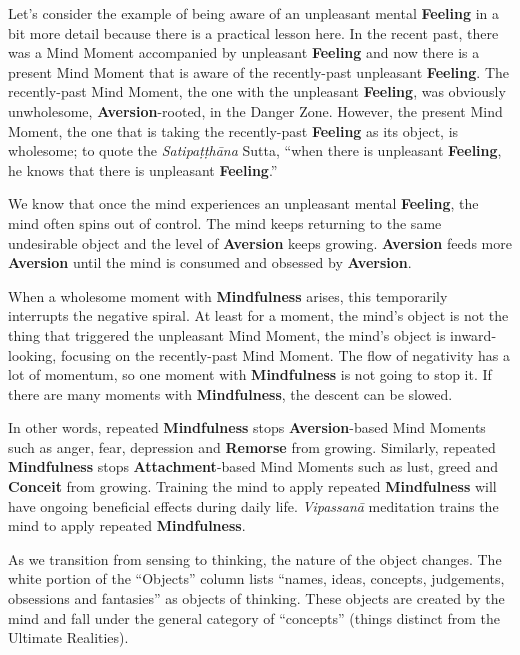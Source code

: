 Let’s consider the example of being aware of an unpleasant mental \textbf{Feeling} in a bit more detail because there is a practical lesson here. In the recent past, there was a Mind Moment accompanied by unpleasant \textbf{Feeling} and now there is a present Mind Moment that is aware of the recently-past unpleasant \textbf{Feeling}. The recently-past Mind Moment, the one with the unpleasant \textbf{Feeling}, was obviously unwholesome, \textbf{Aversion}-rooted, in the Danger Zone. However, the present Mind Moment, the one that is taking the recently-past \textbf{Feeling} as its object, is wholesome; to quote the \textit{Satipaṭṭhāna} Sutta, “when there is unpleasant \textbf{Feeling}, he knows that there is unpleasant \textbf{Feeling}.”

We know that once the mind experiences an unpleasant mental \textbf{Feeling}, the mind often spins out of control. The mind keeps returning to the same undesirable object and the level of \textbf{Aversion} keeps growing. \textbf{Aversion} feeds more \textbf{Aversion} until the mind is consumed and obsessed by \textbf{Aversion}.

When a wholesome moment with \textbf{Mindfulness} arises, this temporarily interrupts the negative spiral. At least for a moment, the mind’s object is not the thing that triggered the unpleasant Mind Moment, the mind’s object is inward-looking, focusing on the recently-past Mind Moment. The flow of negativity has a lot of momentum, so one moment with \textbf{Mindfulness} is not going to stop it. If there are many moments with \textbf{Mindfulness}, the descent can be slowed.

In other words, repeated \textbf{Mindfulness} stops \textbf{Aversion}-based Mind Moments such as anger, fear, depression and \textbf{Remorse} from growing. Similarly, repeated \textbf{Mindfulness} stops \textbf{Attachment}-based Mind Moments such as lust, greed and \textbf{Conceit} from growing. Training the mind to apply repeated \textbf{Mindfulness} will have ongoing beneficial effects during daily life. \textit{Vipassanā} meditation trains the mind to apply repeated \textbf{Mindfulness}.

As we transition from sensing to thinking, the nature of the object changes. The white portion of the “Objects” column lists “names, ideas, concepts, judgements, obsessions and fantasies” as objects of thinking. These objects are created by the mind and fall under the general category of “concepts” (things distinct from the Ultimate Realities).

